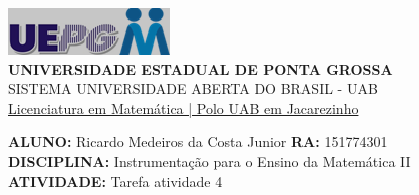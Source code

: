 \documentclass[a4paper, 12pt]{article}
\begin{document}
\begin{flushleft}\includegraphics{logo}\\
\textbf{UNIVERSIDADE ESTADUAL DE PONTA GROSSA} \\
SISTEMA UNIVERSIDADE ABERTA DO BRASIL - UAB \\
\underline{Licenciatura em Matemática | Polo UAB em Jacarezinho}\end{flushleft} 
\textbf{ALUNO:} Ricardo Medeiros da Costa Junior   \textbf{RA:} 151774301 \\
\textbf{DISCIPLINA:} Instrumentação para o Ensino da Matemática II \\
\textbf{ATIVIDADE:} Tarefa atividade 4  \\
\end{document}
